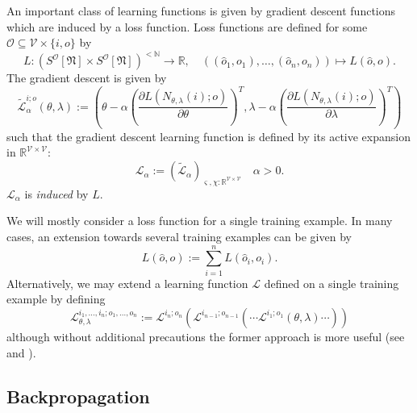 \documentclass[a4paper,11pt]{report}
\newcommand{\const}{\varsigma} %
\newcommand{\var}{\chi} %
\begin{document}
\begin{Par}
An important class of learning functions is given by gradient descent functions which are induced by a loss function. Loss functions are defined for some $\mathcal{O}\subseteq\mathcal{V}\times\{i,o\}$ by
\begin{equation}
L:\left(S^{\mathcal{O}}[\mathfrak{N}]\times S^{\mathcal{O}}[\mathfrak{N}]\right)^{<\mathbb{N}}\to\mathbb{R},
\quad
\left((\hat{o}_1,o_1),\dotsc,(\hat{o}_n,o_n)\right)\mapsto L\left(\hat{o},o\right).
\end{equation}
The gradient descent is given by
\[
\tilde{\mathcal{L}}_{\alpha}^{i;o}(\theta,\lambda):=\left(\theta-\alpha\left(\frac{\partial L\left(N_{\theta,\lambda}(i);o\right)}{\partial\theta}\right)^T,
\lambda-\alpha\left(\frac{\partial L\left(N_{\theta,\lambda}(i);o\right)}{\partial\lambda}\right)^T\right)
\]
such that the gradient descent learning function is defined by its active expansion in $\mathbb{R}^{\mathcal{V}\times\mathcal{V}}$:
\begin{equation}
\mathcal{L}_{\alpha}:=\left(\tilde{\mathcal{L}}_{\alpha}\right)_{\const,\var:\mathbb{R}^{\mathcal{V}\times\mathcal{V}}}
\quad
\alpha>0.
\end{equation}
$\mathcal{L}_{\alpha}$ is \emph{induced} by $L$.
\end{Par}

\begin{Par}\label{training-extension}
We will mostly consider a loss function for a single training example. In many cases, an extension towards several training examples can be given by
\[
L(\hat{o},o):=\sum_{i=1}^nL(\hat{o}_i,o_i).
\]
Alternatively, we may extend a learning function $\mathcal{L}$ defined on a single training example by defining
\begin{equation}
\mathcal{L}^{i_1,\dotsc,i_n;o_1,\dotsc,o_n}_{\theta,\lambda}:=\mathcal{L}^{i_n;o_n}\left(\mathcal{L}^{i_{n-1};o_{n-1}}\left(\dotsb \mathcal{L}^{i_1;o_1}(\theta,\lambda)\dotsb\right)\right)
\end{equation}
although without additional precautions the former approach is more useful (see  and ).
\end{Par}

\subsection{Backpropagation}\label{subsec:theory-learning-backprop}
\end{document}
